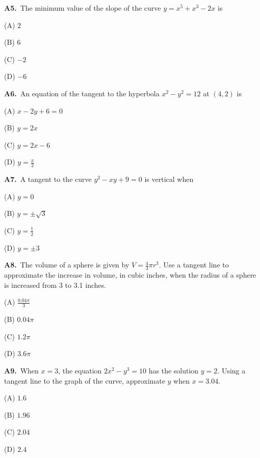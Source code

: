 \documentclass[11pt]{article}
\begin{document}
\bigskip\noindent\textbf{A5.}\ The minimum value of the slope of the curve $y = x^5 + x^3 - 2x$ is
\begin{list}{}{\setlength{\leftmargin}{3em}\setlength{\labelwidth}{2.5em}\setlength{\itemsep}{0pt}\setlength{\topsep}{2pt}}
\item[(A)] $2$
\item[(B)] $6$
\item[(C)] $-2$
\item[(D)] $-6$
\end{list}

\bigskip\noindent\textbf{A6.}\ An equation of the tangent to the hyperbola $x^2-y^2=12$ at $(4,2)$ is
\begin{list}{}{\setlength{\leftmargin}{3em}\setlength{\labelwidth}{2.5em}\setlength{\itemsep}{0pt}\setlength{\topsep}{2pt}}
\item[(A)] $x-2y+6=0$
\item[(B)] $y=2x$
\item[(C)] $y=2x-6$
\item[(D)] $y=\frac x2$
\end{list}

\bigskip\noindent\textbf{A7.}\ A tangent to the curve $y^2-xy+9=0$ is vertical when
\begin{list}{}{\setlength{\leftmargin}{3em}\setlength{\labelwidth}{2.5em}\setlength{\itemsep}{0pt}\setlength{\topsep}{2pt}}
\item[(A)] $y=0$
\item[(B)] $y=\pm\sqrt3$
\item[(C)] $y=\frac12$
\item[(D)] $y=\pm3$
\end{list}

\bigskip\noindent\textbf{A8.}\ The volume of a sphere is given by $V = \frac{4}{3}\pi r^3$. Use a tangent line to approximate the increase in volume, in cubic inches, when the radius of a sphere is increased from 3 to 3.1 inches.
\begin{list}{}{\setlength{\leftmargin}{3em}\setlength{\labelwidth}{2.5em}\setlength{\itemsep}{0pt}\setlength{\topsep}{2pt}}
\item[(A)] $\frac{0.04\pi}3$
\item[(B)] $0.04\pi$
\item[(C)] $1.2\pi$
\item[(D)] $3.6\pi$
\end{list}

\bigskip\noindent\textbf{A9.}\ When $x=3$, the equation $2x^2-y^3=10$ has the solution $y=2$. Using a tangent line to the graph of the curve, approximate $y$ when $x=3.04$.
\begin{list}{}{\setlength{\leftmargin}{3em}\setlength{\labelwidth}{2.5em}\setlength{\itemsep}{0pt}\setlength{\topsep}{2pt}}
\item[(A)] $1.6$
\item[(B)] $1.96$
\item[(C)] $2.04$
\item[(D)] $2.4$
\end{list}
\end{document}
